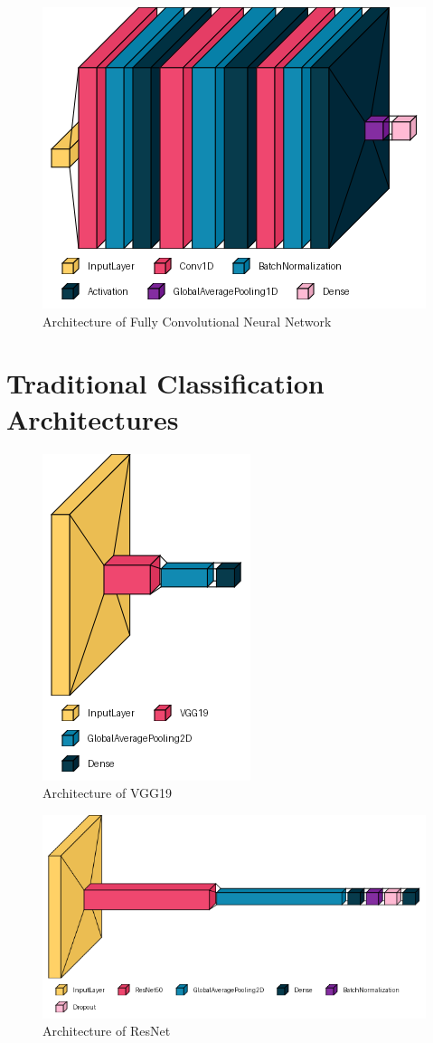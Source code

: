 \begin{figure}
    \centering
    \includegraphics[width=0.5\linewidth]{fcnn.png}
    \caption{Architecture of Fully Convolutional Neural Network}
\end{figure}

\chapter{Traditional Classification Architectures}
\label{ch:trad-architectures}

\begin{figure}[H]
    \centering
    \includegraphics[width=0.4\linewidth]{dissertation//figures/vgg19.png}
    \caption{Architecture of VGG19}
\end{figure}

\begin{figure}[H]
    \centering
    \includegraphics[width=1\linewidth]{dissertation//figures/resnet50.png}
    \caption{Architecture of ResNet}
\end{figure}

